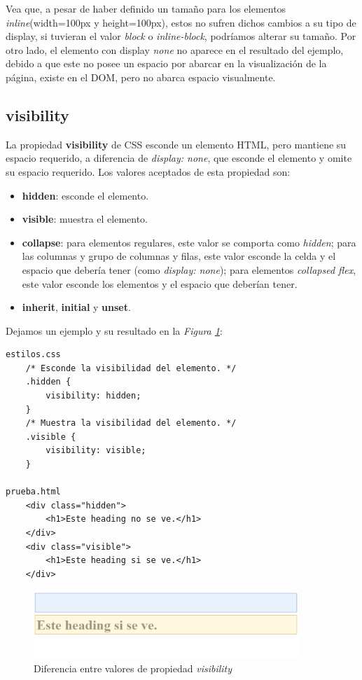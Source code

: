 Vea que, a pesar de haber definido un tamaño para los elementos \textit{inline}(width=100px y height=100px), estos no sufren dichos cambios a su tipo de display, si tuvieran el valor \textit{block} o \textit{inline-block}, podríamos alterar su tamaño. Por otro lado, el elemento con display \textit{none} no aparece en el resultado del ejemplo, debido a que este no posee un espacio por abarcar en la visualización de la página, existe en el DOM, pero no abarca espacio visualmente.


\subsection{visibility}

La propiedad \textbf{visibility} de CSS esconde un elemento HTML, pero mantiene su espacio requerido, a diferencia de \textit{display: none}, que esconde el elemento y omite su espacio requerido. Los valores aceptados de esta propiedad son:
\begin{itemize}
    \item \textbf{hidden}: esconde el elemento.
    \item \textbf{visible}: muestra el elemento.
    \item \textbf{collapse}: para elementos regulares, este valor se comporta como \textit{hidden}; para las columnas y grupo de columnas y filas, este valor esconde la celda y el espacio que debería tener (como \textit{display: none}); para elementos \textit{collapsed flex}, este valor esconde los elementos y el espacio que deberían tener.
    \item \textbf{inherit}, \textbf{initial} y \textbf{unset}.
\end{itemize}

Dejamos un ejemplo y su resultado en la \textit{Figura \ref{fig: 29}}:
\begin{lstlisting}
estilos.css
    /* Esconde la visibilidad del elemento. */
    .hidden {
        visibility: hidden;
    }
    /* Muestra la visibilidad del elemento. */
    .visible {
        visibility: visible;
    }

prueba.html
    <div class="hidden">
        <h1>Este heading no se ve.</h1>
    </div>
    <div class="visible">
        <h1>Este heading si se ve.</h1>
    </div>
\end{lstlisting}
\begin{figure}[H]
    \centering
    \caption{Diferencia entre valores de propiedad \textit{visibility}}
    \label{fig: 29}
    \includegraphics[width=10cm]{ss/visibility.png}
\end{figure}

